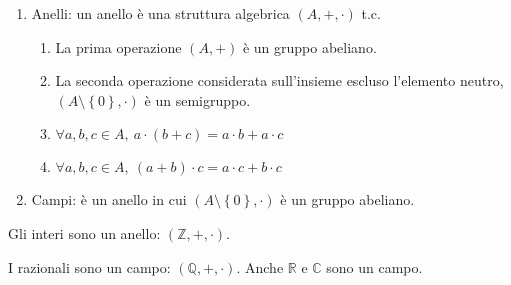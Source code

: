 \begin{enumerate}
    \item Anelli: un anello \`e una struttura algebrica $(A, +, \cdot)$ t.c. 
    \begin{enumerate}
        \item La prima operazione $\left( A, + \right )$ \`e un gruppo abeliano.
        \item La seconda operazione considerata sull'insieme escluso l'elemento neutro, $(A \setminus \left \{ 0 \right \}, \cdot )$ \`e un semigruppo.
        \item $ \forall a, b, c \in A , \ a \cdot (b + c) = a \cdot b + a \cdot c $
        \item $ \forall a, b, c \in A , \ (a + b) \cdot c = a \cdot c + b \cdot c $
    \end{enumerate}
    \item Campi: \`e un anello in cui $( A \setminus \left \{ 0 \right \}, \cdot )$ \`e un gruppo abeliano.
\end{enumerate}

Gli interi sono un anello: $\left ( \mathbb{Z}, +, \cdot \right )$.

I razionali sono un campo: $\left ( \mathbb{Q}, +, \cdot \right )$. Anche $\mathbb{R}$ e $\mathbb{C}$ sono un campo.
